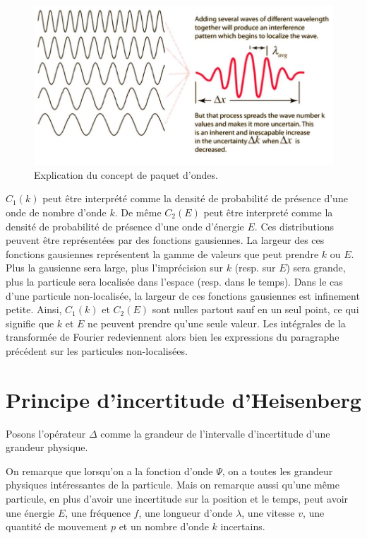 \begin{figure}[ht!]
	\centering
	\includegraphics[scale=0.85]{wave_packets.jpg}
	\caption{Explication du concept de paquet d'ondes.}
	\label{fig:wave-packets}
\end{figure}

$C_1(k)$ peut être interprété comme la densité de probabilité
de présence d'une onde de nombre d'onde $k$. De même $C_2(E)$
peut être interpreté comme la densité de probabilité de 
présence d'une onde d'énergie $E$. Ces distributions
peuvent être représentées par des fonctions gausiennes.
La largeur des ces fonctions gausiennes représentent la
gamme de valeurs que peut prendre $k$ ou $E$. Plus la
gausienne sera large, plus l'imprécision sur $k$ (resp.
sur $E$) sera grande, plus la particule sera localisée
dans l'espace (resp. dans le temps).
Dans le cas d'une particule non-localisée, la largeur
de ces fonctions gausiennes est infinement petite. Ainsi, 
$C_1(k)$ et $C_2(E)$ sont nulles partout sauf en un seul
point, ce qui signifie que $k$
et $E$ ne peuvent prendre qu'une seule valeur.
Les intégrales de la transformée de Fourier 
redeviennent alors bien les expressions du paragraphe
précédent sur les particules non-localisées.

\section{Principe d'incertitude d'Heisenberg}
\begin{mynota}
  Posons l'opérateur $\Delta$ comme
  la grandeur de l’intervalle d'incertitude
  d'une grandeur physique.
\end{mynota}

On remarque que lorsqu'on a la fonction d'onde $\Psi$,
on a toutes les grandeur physiques intéressantes de la particule.
Mais on remarque aussi qu'une même particule,
en plus d'avoir une incertitude sur la position et le temps,
peut avoir une énergie $E$, une fréquence $f$,
une longueur d'onde $\lambda$, une vitesse $v$,
une quantité de mouvement $p$ et un nombre d'onde $k$ incertains.

